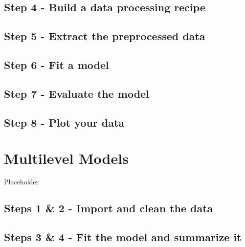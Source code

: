 \documentclass[
]{book}
\begin{document}
\hypertarget{step-4---build-a-data-processing-recipe}{%
\section{Step 4 - Build a data processing recipe}\label{step-4---build-a-data-processing-recipe}}

\hypertarget{step-5---extract-the-preprocessed-data}{%
\section{Step 5 - Extract the preprocessed data}\label{step-5---extract-the-preprocessed-data}}

\hypertarget{step-6---fit-a-model}{%
\section{Step 6 - Fit a model}\label{step-6---fit-a-model}}

\hypertarget{step-7---evaluate-the-model}{%
\section{Step 7 - Evaluate the model}\label{step-7---evaluate-the-model}}

\hypertarget{step-8---plot-your-data}{%
\section{Step 8 - Plot your data}\label{step-8---plot-your-data}}

\hypertarget{multilevel-models}{%
\chapter{Multilevel Models}\label{multilevel-models}}

Placeholder

\hypertarget{steps-1-2---import-and-clean-the-data}{%
\section{Steps 1 \& 2 - Import and clean the data}\label{steps-1-2---import-and-clean-the-data}}

\hypertarget{steps-3-4---fit-the-model-and-summarize-it-2}{%
\section{Steps 3 \& 4 - Fit the model and summarize it}\label{steps-3-4---fit-the-model-and-summarize-it-2}}
\end{document}
